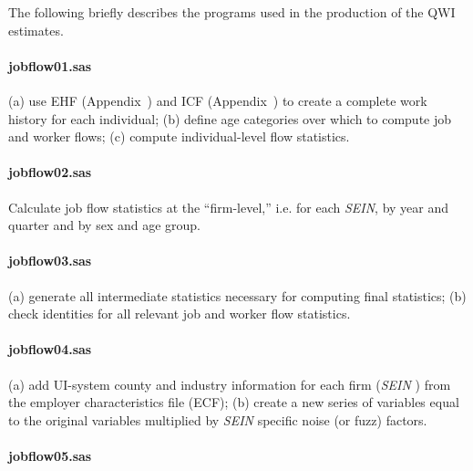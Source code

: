 
%
%

The following briefly describes the programs used in the production of the
QWI estimates. 

\paragraph{jobflow01.sas }

(a) use EHF (Appendix~) and
ICF (Appendix~) to create a complete
work history for each individual; (b) define age categories over which to
compute job and worker flows; (c) compute individual-level flow statistics.

\paragraph{jobflow02.sas }

Calculate job flow statistics at the ``firm-level,'' i.e. for each \textit{SEIN}, by 
year and quarter and by sex and age group.

\paragraph{jobflow03.sas }

(a) generate all intermediate statistics necessary for computing final 
statistics; (b) check identities for all relevant job and worker flow 
statistics.

\paragraph{jobflow04.sas }

(a) add UI-system county and industry information for each firm (\textit{SEIN%
}) from the employer characteristics file (ECF); (b) create a new series of
variables equal to the original variables multiplied by \textit{SEIN}
specific noise (or fuzz) factors.

\paragraph{jobflow05.sas }


